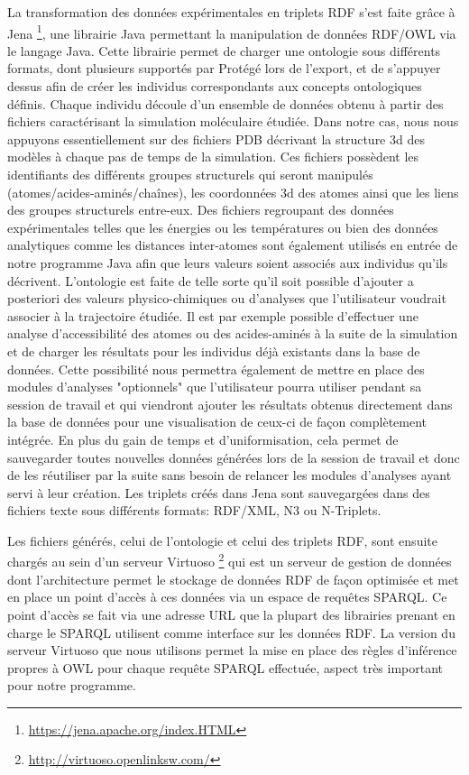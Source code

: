 La transformation des données expérimentales en triplets RDF s'est faite grâce à Jena \footnote{\url{https://jena.apache.org/index.HTML}}, une librairie Java permettant la manipulation de données RDF/OWL via le langage Java. Cette librairie permet de charger une ontologie sous différents formats, dont plusieurs supportés par Protégé lors de l'export, et de s'appuyer dessus afin de créer les individus correspondants aux concepts ontologiques définis. Chaque individu découle d'un ensemble de données obtenu à partir des fichiers caractérisant la simulation moléculaire étudiée. Dans notre cas, nous nous appuyons essentiellement sur des fichiers PDB décrivant la structure 3d des modèles à chaque pas de temps de la simulation. Ces fichiers possèdent les identifiants des différents groupes structurels qui seront manipulés (atomes/acides-aminés/chaînes), les coordonnées 3d des atomes ainsi que les liens des groupes structurels entre-eux. Des fichiers regroupant des données expérimentales telles que les énergies ou les températures ou bien des données analytiques comme les distances inter-atomes sont également utilisés en entrée de notre programme Java afin que leurs valeurs soient associés aux individus qu'ils décrivent. L'ontologie est faite de telle sorte qu'il soit possible d'ajouter a posteriori des valeurs physico-chimiques ou d'analyses que l'utilisateur voudrait associer à la trajectoire étudiée. Il est par exemple possible d'effectuer une analyse d'accessibilité des atomes ou des acides-aminés à la suite de la simulation et de charger les résultats pour les individus déjà existants dans la base de données. Cette possibilité nous permettra également de mettre en place des modules d'analyses "optionnels" que l'utilisateur pourra utiliser pendant sa session de travail et qui viendront ajouter les résultats obtenus directement dans la base de données pour une visualisation de ceux-ci de façon complètement intégrée. En plus du gain de temps et d'uniformisation, cela permet de sauvegarder toutes nouvelles données générées lors de la session de travail et donc de les réutiliser par la suite sans besoin de relancer les modules d'analyses ayant servi à leur création.
Les triplets créés dans Jena sont sauvegargées dans des fichiers texte sous différents formats: RDF/XML, N3 ou N-Triplets. 

Les fichiers générés, celui de l'ontologie et celui des triplets RDF, sont ensuite chargés au sein d'un serveur Virtuoso \footnote{\url{http://virtuoso.openlinksw.com/}} qui est un serveur de gestion de données dont l'architecture permet le stockage de données RDF de façon optimisée et met en place un point d'accès à ces données via un espace de requêtes SPARQL. Ce point d'accès se fait via une adresse URL que la plupart des librairies prenant en charge le SPARQL utilisent comme interface sur les données RDF. La version du serveur Virtuoso que nous utilisons permet la mise en place des règles d'inférence propres à OWL pour chaque requête SPARQL effectuée, aspect très important pour notre programme.

